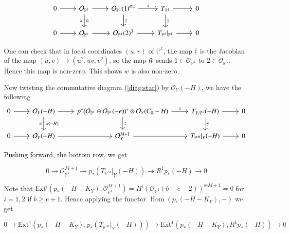 \documentclass[11pt,twoside]{amsart}
\theoremstyle{plain}
\numberwithin{equation}{section}
\theoremstyle{definition}
\begin{document}
\[
\begin{tikzcd}
  0 \arrow[r] & \mathcal{O}_{\mathbb{P}^1} \arrow[r] \arrow[d, "\Bar{w}", "\cong"'] & \mathcal{O}_{\mathbb{P}^1}(1)^{\oplus 2} \arrow[r, "\Bar{x}"] \arrow[d, "\Bar{z}"] & T_{\mathbb{P}^1} \arrow[r] \arrow[d, "\Bar{y}"] & 0 \\
   0 \arrow[r] & \mathcal{O}_{\mathbb{P}^1} \arrow[r] & \mathcal{O}_{\mathbb{P}^1}(2)^{3} \arrow[r] & T_{\mathbb{P}^2}|_{\mathbb{P}^1} \arrow[r] & 0
\end{tikzcd}
\]

One can check that in local coordinates $(u,v)$ of $\mathbb{P}^1$, the map $\Bar{z}$ is the Jacobian of the map $(u,v) \to (u^2, uv, v^2)$, so the map $\Bar{w}$ sends $1 \in \mathcal{O}_{\mathbb{P}^1}$ to $2 \in \mathcal{O}_{\mathbb{P}^1}$. Hence this map is non-zero. \textcolor{black}{This shows} $w$ is also non-zero. 


Now twisting the commutative diagram (\ref{diag:star}) by $\mathcal{O}_Y(-H)$, we have the following
\begin{equation}
\begin{tikzcd}\label{relative Euler and Euler}
  0 \arrow[r] & \mathcal{O}_Y(-H) \arrow[r] \arrow[d, "w(-H)", "\cong"'] & p^*(\mathcal{O}_{\mathbb{P}^1} \oplus \mathcal{O}_{\mathbb{P}^1}(-e))^* \otimes \mathcal{O}_Y(C_0-H) \arrow[r, "x"] \arrow[d, "z"] & T_{Y/\mathbb{P}^1}(-H) \arrow[r] \arrow[d, "y"] & 0 \\
   0 \arrow[r] & \mathcal{O}_Y(-H) \arrow[r] & \mathcal{O}_Y^{M+1} \arrow[r] & T_{\mathbb{P}^M}|_Y(-H) \arrow[r] & 0
\end{tikzcd}
\end{equation}
\color{black}
 
\textcolor{black}{Pushing} forward, \textcolor{black}{the bottom row}, \textcolor{black}{we} get 

 \begin{equation}\label{25}
     0 \to \mathcal{O}_{\mathbb{P}^1}^{M+1} \to p_*(T_{\mathbb{P}^M}|_Y(-H)) \to R^1p_*(-H) \to 0
 \end{equation}

Note that $\operatorname{Ext^i}(p_*(-H-K_Y),  \mathcal{O}_{\mathbb{P}^1}^{M+1}) = H^i(\mathcal{O}_{\mathbb{P}^1}(b-e-2))^{\oplus M+1} = 0$ for $i = 1,2$ if $b \geq e+1$. Hence applying the functor $\operatorname{Hom}(p_*(-H-K_Y), -)$ we get 

\begin{equation}\label{26}
     0 \to \operatorname{Ext^1}(p_*(-H-K_Y), 
 p_*(T_{\mathbb{P}^M}|_Y(-H))) \to \operatorname{Ext^1}(p_*(-H-K_Y), 
 R^1p_*(-H)) \to 0
 \end{equation}
\end{document}
